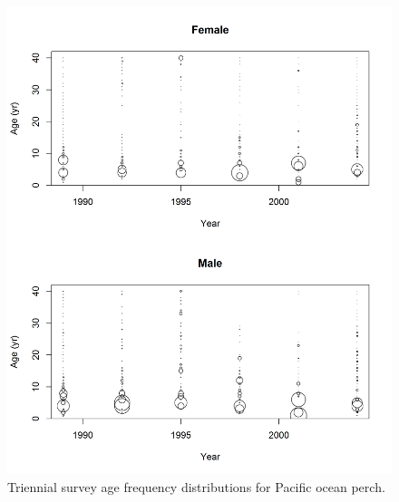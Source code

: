 \documentclass[12pt,]{article}
\begin{document}
\begin{figure}
\centering
\includegraphics{Figures/Triennial_Ages.png}
\caption{Triennial survey age frequency distributions for Pacific ocean
perch. \label{fig:Tri_Age}}
\end{figure}
\end{document}
